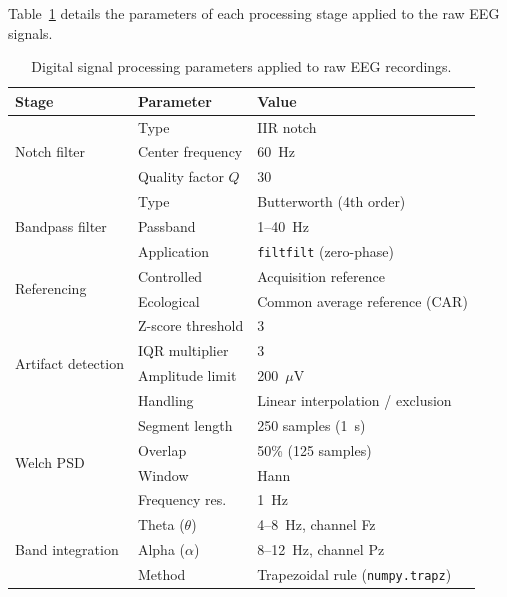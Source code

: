 \documentclass[10pt]{iopart}
\begin{document}
Table~\ref{tab:dsp_params} details the parameters of each
processing stage applied to the raw EEG signals.

\begin{table}[t]
\centering
\caption{Digital signal processing parameters applied to raw EEG recordings.}
\label{tab:dsp_params}
\footnotesize
\setlength{\tabcolsep}{8pt}
\begin{tabular}{llp{4.5cm}}
\toprule
\textbf{Stage} & \textbf{Parameter} & \textbf{Value} \\
\midrule
\multirow{3}{*}{Notch filter}
                  & Type              & IIR notch \\
                  & Center frequency  & 60~Hz \\
                  & Quality factor $Q$& 30 \\
\midrule
\multirow{3}{*}{Bandpass filter}
                  & Type              & Butterworth (4th order) \\
                  & Passband          & 1--40~Hz \\
                  & Application       & \texttt{filtfilt} (zero-phase) \\
\midrule
\multirow{2}{*}{Referencing}
                  & Controlled        & Acquisition reference \\
                  & Ecological        & Common average reference (CAR) \\
\midrule
\multirow{4}{*}{Artifact detection}
                  & Z-score threshold & 3 \\
                  & IQR multiplier    & 3 \\
                  & Amplitude limit   & 200~$\mu$V \\
                  & Handling          & Linear interpolation / exclusion \\
\midrule
\multirow{4}{*}{Welch PSD}
                  & Segment length    & 250 samples (1~s) \\
                  & Overlap           & 50\% (125 samples) \\
                  & Window            & Hann \\
                  & Frequency res.    & 1~Hz \\
\midrule
\multirow{3}{*}{Band integration}
                  & Theta ($\theta$)  & 4--8~Hz, channel Fz \\
                  & Alpha ($\alpha$)  & 8--12~Hz, channel Pz \\
                  & Method            & Trapezoidal rule (\texttt{numpy.trapz}) \\
\bottomrule
\end{tabular}
\end{table}
\end{document}
